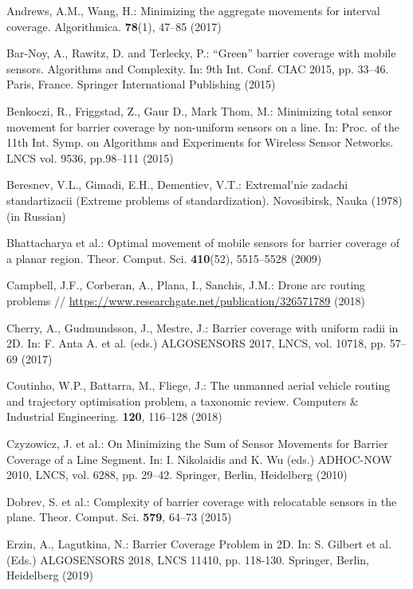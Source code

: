 \documentclass[runningheads]{llncs}
\begin{document}
\begin{thebibliography}{8}
 Andrews, A.M., Wang, H.: Minimizing the aggregate movements for interval coverage. Algorithmica. \textbf{78}(1), 47--85 (2017)

 Bar-Noy, A., Rawitz, D. and Terlecky, P.: ``Green'' barrier coverage with mobile sensors. Algorithms and Complexity. In: 9th Int. Conf. CIAC 2015, pp. 33--46. Paris, France. Springer International Publishing (2015)

 Benkoczi, R., Friggstad, Z., Gaur D., Mark Thom, M.: Minimizing total sensor movement for barrier coverage by non-uniform sensors on a line. In: Proc. of the 11th Int. Symp. on Algorithms and Experiments for Wireless Sensor Networks. LNCS vol. 9536, pp.98--111 (2015)

 Beresnev, V.L., Gimadi, E.H., Dementiev, V.T.: Extremal'nie zadachi standartizacii (Extreme problems of standardization). Novosibirsk, Nauka (1978) (in Russian)

 Bhattacharya et al.: Optimal movement of mobile sensors for barrier coverage of a planar region. Theor. Comput. Sci. \textbf{410}(52), 5515--5528 (2009)

 Campbell, J.F., Corberan, A., Plana, I., Sanchis, J.M.: Drone arc routing problems // \url{https://www.researchgate.net/publication/326571789} (2018)

 Cherry, A., Gudmundsson, J.,  Mestre, J.: Barrier coverage with uniform radii in 2D. In: F. Anta A. et al. (eds.) ALGOSENSORS 2017, LNCS, vol. 10718, pp. 57--69 (2017)

 Coutinho, W.P., Battarra, M., Fliege, J.: The unmanned aerial vehicle routing and trajectory optimisation problem, a taxonomic review. Computers \& Industrial Engineering. \textbf{120}, 116--128 (2018)

 Czyzowicz, J. et al.: On Minimizing the Sum of Sensor Movements for Barrier Coverage of a Line Segment. In: I. Nikolaidis and K. Wu (eds.) ADHOC-NOW 2010, LNCS, vol. 6288, pp. 29--42. Springer, Berlin, Heidelberg (2010)

 Dobrev, S. et al.: Complexity of barrier coverage with relocatable sensors in the plane. Theor. Comput. Sci. \textbf{579}, 64--73 (2015)

 Erzin, A., Lagutkina, N.: Barrier Coverage Problem in 2D. In: S. Gilbert  et al. (Eds.) ALGOSENSORS 2018, LNCS 11410, pp. 118-130. Springer, Berlin, Heidelberg (2019)


\end{thebibliography}
\end{document}
